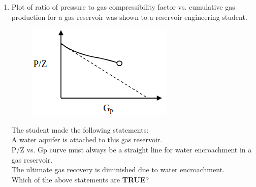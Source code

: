 \documentclass[journal,12pt,onecolumn]{IEEEtran}
\theoremstyle{remark}
\begin{document}
\begin{enumerate}
\begin{enumerate}
\end{enumerate}

\item Plot of ratio of pressure to gas compressibility factor  vs. cumulative gas production
 for a gas reservoir  was shown to a reservoir
engineering student.

\hfill{}

\begin{figure}[h!]
  \centering
  \includegraphics[width=0.5\columnwidth]{figs/pic4.png} 
\end{figure}

\noindent
The student made the following statements:\\
 A water aquifer is attached to this gas reservoir.\\
 P/Z vs. Gp curve must always be a straight line for water encroachment in a gas
reservoir.\\
 The ultimate gas recovery is diminished due to water encroachment.\\

Which of the above statements are \textbf{TRUE}?


\begin{enumerate}
\end{enumerate}


\end{enumerate}
\end{document}
